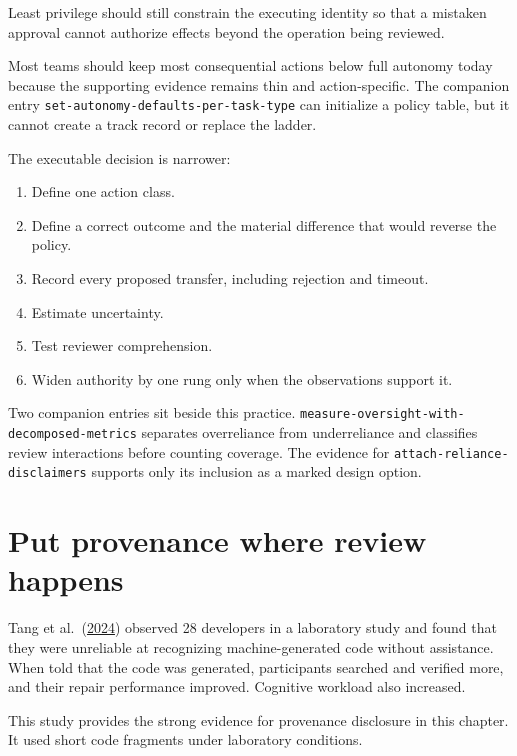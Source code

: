 Least privilege should still constrain the executing identity so that a mistaken approval cannot authorize effects beyond the operation being reviewed.

Most teams should keep most consequential actions below full autonomy today because the supporting evidence remains thin and action-specific. The companion entry \texttt{set-autonomy-defaults-per-task-type} can initialize a policy table, but it cannot create a track record or replace the ladder.


The executable decision is narrower:

\begin{enumerate}
\def\labelenumi{\arabic{enumi}.}
\tightlist
\item
  Define one action class.
\item
  Define a correct outcome and the material difference that would reverse the policy.
\item
  Record every proposed transfer, including rejection and timeout.
\item
  Estimate uncertainty.
\item
  Test reviewer comprehension.
\item
  Widen authority by one rung only when the observations support it.
\end{enumerate}

Two companion entries sit beside this practice. \texttt{measure-oversight-with-decomposed-metrics} separates overreliance from underreliance and classifies review interactions before counting coverage. The evidence for \texttt{attach-reliance-disclaimers} supports only its inclusion as a marked design option.

\hypertarget{put-provenance-where-review-happens}{%
\section{Put provenance where review happens}\label{put-provenance-where-review-happens}}

Tang et al.~(\href{https://arxiv.org/abs/2405.16081}{2024}) observed 28 developers in a laboratory study and found that they were unreliable at recognizing machine-generated code without assistance. When told that the code was generated, participants searched and verified more, and their repair performance improved. Cognitive workload also increased.

This study provides the strong evidence for provenance disclosure in this chapter. It used short code fragments under laboratory conditions.

